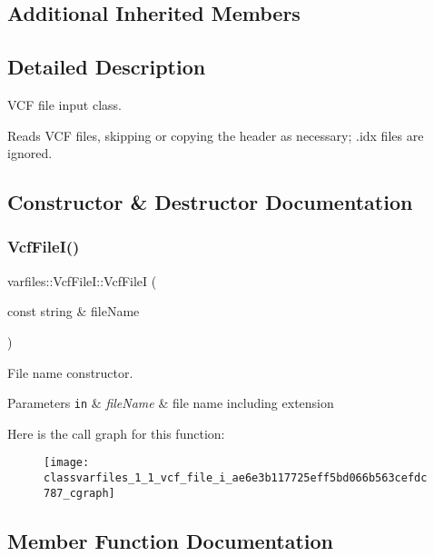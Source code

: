 \subsection*{Additional Inherited Members}


\subsection{Detailed Description}
V\+CF file input class. 

Reads V\+CF files, skipping or copying the header as necessary; .idx files are ignored. 

\subsection{Constructor \& Destructor Documentation}
\mbox{\label{classvarfiles_1_1_vcf_file_i_ae6e3b117725eff5bd066b563cefdc787}} 
\subsubsection{\texorpdfstring{Vcf\+File\+I()}{VcfFileI()}}
{\footnotesize\ttfamily varfiles\+::\+Vcf\+File\+I\+::\+Vcf\+FileI (\begin{DoxyParamCaption}\item[{const string \&}]{file\+Name }\end{DoxyParamCaption})\hspace{0.3cm}{\ttfamily [inline]}}



File name constructor. 


\begin{DoxyParams}[1]{Parameters}
\mbox{\tt in}  & {\em file\+Name} & file name including extension \\
\hline
\end{DoxyParams}
Here is the call graph for this function\+:\nopagebreak
\begin{figure}[H]
\begin{center}
\leavevmode
\texttt{[image: classvarfiles\_1\_1\_vcf\_file\_i\_ae6e3b117725eff5bd066b563cefdc787\_cgraph]}
\end{center}
\end{figure}


\subsection{Member Function Documentation}
\mbox{\label{classvarfiles_1_1_vcf_file_i_a1f8fcdba2d343654b3c9492a3dd80e93}} 
